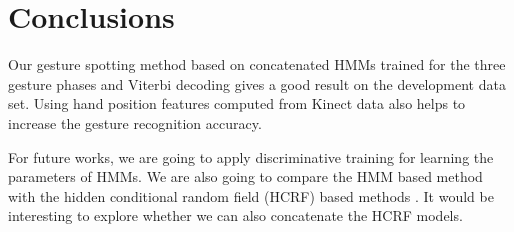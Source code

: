\documentclass{sig-alternate-2013}
\begin{document}
\section{Conclusions}
Our gesture spotting method based on concatenated HMMs trained for the three gesture phases
and Viterbi decoding gives a good result on the development data set. Using hand position features computed from
Kinect data also helps to increase the gesture recognition accuracy. 

For future works, we are going to apply discriminative training for learning the
parameters of HMMs. We are also going to compare the HMM based method with the
hidden conditional random field (HCRF) based methods \cite{morency07, wang06}.
It would be interesting to explore whether we can also concatenate the HCRF
models.
 


%
\vfill\eject
\end{document}
